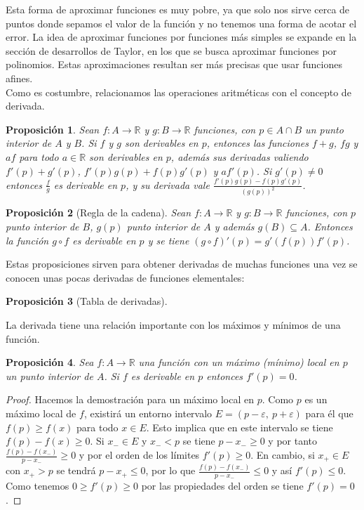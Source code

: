 \documentclass{article}
\newtheorem{prop}{Proposición}
\newcommand{\reales}{\mathbb{R}}
\begin{document}
Esta forma de aproximar funciones es muy pobre, ya que solo nos sirve cerca de puntos donde sepamos el valor de la función y no tenemos una forma de acotar el error.
La idea de aproximar funciones por funciones más simples se expande en la sección de desarrollos de Taylor, en los que se busca aproximar funciones por polinomios. Estas aproximaciones resultan ser más precisas que usar funciones afines.\\ 
Como es costumbre, relacionamos las operaciones aritméticas con el concepto de derivada.

\begin{prop}
	Sean $f: A \rightarrow \reales$ y $g: B \rightarrow \reales$ funciones, con $p \in A \cap B$ un punto interior de $A$ y $B$. Si $f$ y $g$ son derivables en $p$, entonces las funciones $f + g$, $fg$ y $af$ para todo $a \in \reales$ son derivables en $p$, además sus derivadas valiendo $f'(p) + g'(p)$, $f'(p)g(p) + f(p)g'(p)$ y $af'(p)$. Si $g'(p) \neq 0$ entonces $\frac{f}{g}$ es derivable en $p$, y su derivada vale $\frac{f'(p)g(p) - f(p)g'(p)}{(g(p))^2}$.
\end{prop}

\begin{prop}[Regla de la cadena]
	Sean $f: A \rightarrow \reales$ y $g: B \rightarrow \reales$ funciones, con $p$ punto interior de $B$, $g(p)$ punto interior de $A$ y además $g(B) \subseteq A$. Entonces la función $g \circ f$ es derivable en $p$ y se tiene $(g \circ f)'(p) = g'(f(p))f'(p)$.
\end{prop} 

Estas proposiciones sirven para obtener derivadas de muchas funciones una vez se conocen unas pocas derivadas de funciones elementales:
\begin{prop}[Tabla de derivadas]

\end{prop}
La derivada tiene una relación importante con los máximos y mínimos de una función.

\begin{prop}
	Sea $f: A \rightarrow \reales$ una función con un máximo (mínimo) local en $p$ un punto interior de $A$. Si $f$ es derivable en $p$ entonces $f'(p) = 0$.
\end{prop}
\begin{proof}
	Hacemos la demostración para un máximo local en $p$. Como $p$ es un máximo local de $f$, existirá un entorno intervalo $E=(p-\varepsilon,\ p+\varepsilon)$ para él que $f(p) \geq f(x)$ para todo $x \in E$. Esto implica que en este intervalo se tiene $f(p) - f(x) \geq 0$. Si $x_{-} \in E$ y $x_{-} < p$ se tiene $p - x_{-} \geq 0$ y por tanto $\frac{f(p) - f(x_{-})}{p - x_{-}} \geq 0$ y por el orden de los límites $f'(p) \geq 0$. En cambio, si $x_{+} \in E$ con $x_{+} > p$ se tendrá $p - x_{+} \leq 0$, por lo que $\frac{f(p) - f(x_{-})}{p - x_{-}} \leq 0$ y así $f'(p) \leq 0$. Como tenemos $0 \geq f'(p) \geq 0$ por las propiedades del orden se tiene $f'(p) = 0$.
\end{proof}
\end{document}
